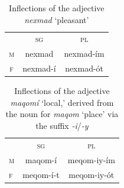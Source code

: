 \begin{description}
   \begin{table}[h!]
      \small
      \centering
       \setlength{\extrarowheight}{8pt}
      \begin{tabular}{ccc} 
 \toprule
 & \textsc{sg} & \textsc{pl} \\
\cmidrule{2-3}
    \textsc{m} & nexmad & nexmad-\'{i}m \\
   \textsc{f} &  nexmad-\'{i} & nexmad-\'{o}t \\
    \bottomrule
    \end{tabular}
    \label{tab:non-y-adjs}
    \caption{Inflections of the adjective \textit{nexmad} `pleasant'}
    \end{table}


\begin{table}[ht]
\centering
\small
\setlength{\extrarowheight}{8pt}
\begin{tabular}{lcc}
\toprule
& \textsc{sg} & \textsc{pl}  \\
\cmidrule(lr){2-3}
\textsc{m} & maqom-\'{i} &  meqom-iy-\'{i}m\\
\textsc{f} & meqom-\'{i}-t  & meqom-iy-\'{o}t  \\
\bottomrule
\end{tabular}
\label{tab:der-adjs}
\caption{Inflections of the adjective \textit{maqom\'{i}} `local,' derived from the noun for \textit{maqom} `place' via the suffix \textit{-i}/\textit{-y}}
\end{table}


\end{description}
